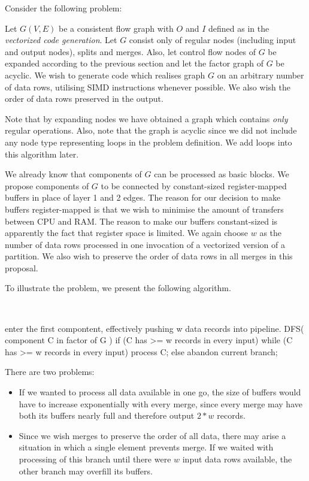 Consider the following problem:

  Let $G(V,E)$ be a consistent flow graph with $O$ and $I$ defined as in the \emph{vectorized code generation}. Let $G$ consist only of regular nodes (including input and output nodes), splits and merges.  Also, let control flow nodes of $G$ be expanded according to the previous section and let the factor graph of $G$ be acyclic. We wish to generate code which realises graph $G$ on an arbitrary number of data rows, utilising SIMD instructions whenever possible. We also wish the order of data rows preserved in the output.
\myendprob

\begin{rem} 
Note that by expanding nodes we have obtained a graph which contains \emph{only} regular operations. Also, note that the graph is acyclic since we did not include any node type representing loops in the problem definition. We add loops into this algorithm later.
\end{rem}

We already know that components of $G$ can be processed as basic blocks. We propose components of $G$ to be connected by constant-sized register-mapped buffers in place of layer 1 and 2 edges. The reason for our decision to make buffers register-mapped is that we wish to minimise the amount of transfers between CPU and RAM. The reason to make our buffers constant-sized is apparently the fact that register space is limited. We again choose $w$ as the number of data rows processed in one invocation of a vectorized version of a partition. We also wish to preserve the order of data rows in all merges in this proposal.


To illustrate the problem, we present the following algorithm.

 \ 
\begin{code}
enter the first compontent, 
  effectively pushing w data records into pipeline.
DFS( component C in factor of G )
{
  if (C has >= w records in every input)
    while (C has >= w records in every input)
      process C;
  else
    abandon current branch;
}
\end{code}
\myendalg

There are two problems:

\begin{itemize}
  \item If we wanted to process all data available in one go, the size of buffers would have to increase exponentially with every merge, since every merge may have both its buffers nearly full and therefore output $2*w$ records.
  \item Since we wish merges to preserve the order of all data, there may arise a situation in which a single element prevents merge. If we waited with processing of this branch until there were $w$ input data rows available, the other branch may overfill its buffers.
\end{itemize}

